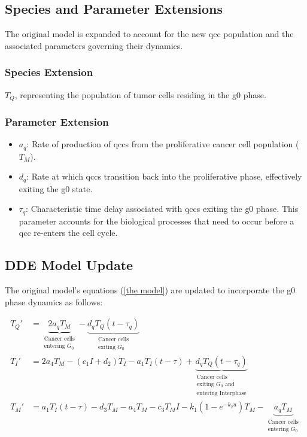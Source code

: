 \subsection{Species and Parameter Extensions}

The original model is expanded to account for the new \gls{qcc} population and the associated parameters governing their dynamics.

\subsubsection{Species Extension}
$T_Q$, representing the population of tumor cells residing in the \gls{g0} phase.

\subsubsection{Parameter Extension}

\begin{itemize}
    \item $a_q$: Rate of production of \gls{qcc}s from the proliferative cancer cell population ($T_M$).
    \item $d_q$: Rate at which \gls{qcc}s transition back into the proliferative phase, effectively exiting the \gls{g0} state.
    \item $\tau_q$: Characteristic time delay associated with \gls{qcc}s exiting the \gls{g0} phase. This parameter accounts for the biological processes that need to occur before a \gls{qcc} re-enters the cell cycle.
\end{itemize}

\subsection{DDE Model Update}

The original model's equations (\ref{the model}) are updated to incorporate the \gls{g0} phase dynamics as follows:

\begin{align} 
T_Q' &= \underbrace{2a_q T_M}_{\substack{\text{Cancer cells}\\\text{entering } G_0}} - \underbrace{d_q T_Q (t-\tau_q)}_{\substack{\text{Cancer cells}\\\text{exiting } G_0}} \label{eq:1} \\
T_I' &= 2a_4 T_M - (c_1 I + d_2)T_I - a_1 T_I (t-\tau) + \underbrace{d_q T_Q (t - \tau_q)}_{\substack{\text{Cancer cells}\\\text{exiting } G_0\text{ and}\\\text{entering Interphase}}} \label{eq:2}\\
T_M' &= a_1 T_I (t - \tau) - d_3 T_M - a_4 T_M - c_3 T_M I - k_1 (1 - e^{-k_2 u}) T_M - \underbrace{a_q T_M}_{\substack{\text{Cancer cells}\\\text{entering } G_0}} \label{eq:3}
\end{align}

